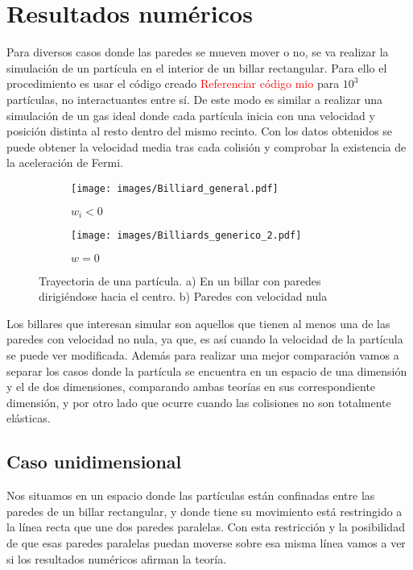 \documentclass[11pt, spanish]{book}
\begin{document}
\chapter{Resultados numéricos}

Para diversos casos donde las paredes se mueven mover o no, se va realizar la simulación de un partícula en el interior de un billar rectangular. Para ello el procedimiento es usar el código creado \textcolor{red}{Referenciar código mio} para \( 10^3 \) partículas, no interactuantes entre sí. De este modo es similar a realizar una simulación de un gas ideal donde cada partícula inicia con una velocidad y posición distinta al resto dentro del mismo recinto. Con los datos obtenidos se puede obtener la velocidad media tras cada colisión y comprobar la existencia de la aceleración de Fermi.

\begin{figure}[H]
    \begin{subfigure}[b]{0.5\textwidth}
        \centering
        \texttt{[image: images/Billiard\_general.pdf]}
        \caption{$w_i<0$}
        \label{fig:a}
    \end{subfigure}
    \hfill
    \begin{subfigure}[b]{0.5\textwidth}
        \centering
        \texttt{[image: images/Billiards\_generico\_2.pdf]}
        \caption{$w=0$}
        \label{fig:s}
    \end{subfigure}
    \caption{Trayectoria de una partícula. a) En un billar con paredes dirigiéndose hacia el centro. b) Paredes con velocidad nula}
\end{figure}


Los billares que interesan simular son aquellos que tienen al menos una de las paredes con velocidad no nula, ya que, es así cuando la velocidad de la partícula se puede ver modificada. Además para realizar una mejor comparación vamos a separar los casos donde la partícula se encuentra en un espacio de una dimensión y el de dos dimensiones, comparando ambas teorías en sus correspondiente dimensión, y por otro lado que ocurre cuando las colisiones no son totalmente elásticas.

\section{Caso unidimensional}

Nos situamos en un espacio donde las partículas están confinadas entre las paredes de un billar rectangular, y donde tiene su movimiento está restringido a la línea recta que une dos paredes paralelas. Con esta restricción y la posibilidad de que esas paredes paralelas puedan moverse sobre esa misma línea vamos a ver si los resultados numéricos afirman la teoría.
\end{document}
